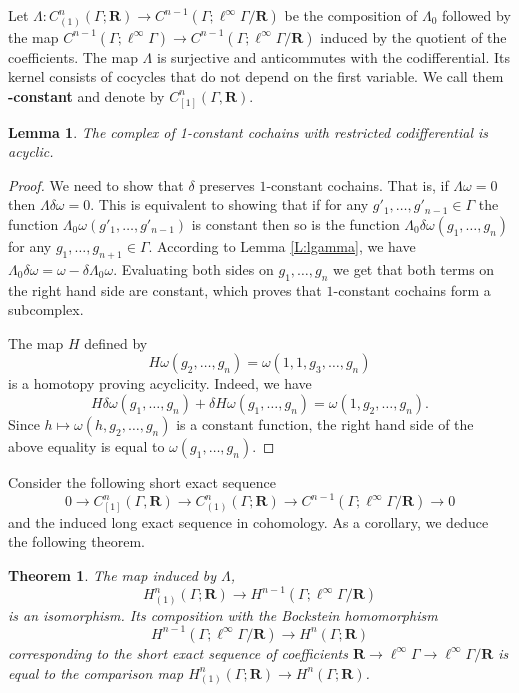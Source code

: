 \documentclass[12pt,reqno,a4paper]{amsart}
\renewcommand{\emph}[1]{{\bfseries\boldmath #1}}
\newtheorem{theorem}[subsection]{Theorem}%
\newtheorem{lemma}[subsection]{Lemma}
\theoremstyle{definition}
\theoremstyle{remark}
\numberwithin{equation}{section}
\numberwithin{figure}{section}
\newcommand{\B}[1]{{\mathbf #1}}
\begin{document}
Let $\Lambda\colon C^n_{(1)}(\Gamma;\B R)\to C^{n-1}(\Gamma;\ell^\infty\Gamma/\B R)$
be the composition of $\Lambda_0$ followed by the map
$C^{n-1}(\Gamma;\ell^{\infty}\Gamma) \to C^{n-1}(\Gamma;\ell^{\infty}\Gamma/\B R)$
induced by the quotient of the coefficients.
The map $\Lambda$ is surjective and anticommutes with the codifferential.  
Its kernel consists of cocycles that do not depend on the first variable.
We call them \emph{1-constant} and denote by $C^n_{[1]}(\Gamma,\B R)$.

\begin{lemma}\label{L:1-const}
The complex of 1-constant cochains with restricted codifferential is acyclic.
\end{lemma}

\begin{proof}
We need to show that $\delta$ preserves $1$-constant cochains. That is,
if $\Lambda\omega=0$ then $\Lambda\delta\omega=0$. This is equivalent to
showing that if for any $g'_1,\ldots,g'_{n-1}\in \Gamma$ the function
$\Lambda_0\omega(g'_1,\ldots,g'_{n-1})$ is constant then so is the function
$\Lambda_0\delta\omega(g_1,\ldots,g_{n})$ for any 
$g_1,\ldots,g_{n+1}\in \Gamma$. According to Lemma \ref{L:lgamma}, we have
$\Lambda_0\delta\omega = \omega - \delta\Lambda_0\omega$. 
Evaluating both sides on $g_1,\ldots,g_n$ we get that both
terms on the right hand side are constant, which proves that $1$-constant
cochains form a subcomplex.

The map $H$ defined by
$$
H\omega(g_2,\dots,g_n)=\omega(1,1,g_3,\dots,g_n)
$$
is a homotopy proving acyclicity. Indeed, we have
$$
H\delta\omega(g_1,\ldots,g_n) + \delta H\omega(g_1,\ldots,g_n)
=\omega(1,g_2,\ldots,g_n).
$$
Since $h\mapsto \omega(h,g_2,\ldots,g_n)$ is a constant function,
the right hand side of the above equality is equal to $\omega(g_1,\ldots,g_n)$.
\end{proof}

Consider the following short exact sequence
$$
0\to C^n_{[1]}(\Gamma,\B R)\to C^n_{(1)}(\Gamma;\B R)\to C^{n-1}(\Gamma;\ell^\infty\Gamma/\B R)\to0
$$
and the induced long exact sequence in cohomology.  As a corollary, we
deduce the following theorem.

\begin{theorem}\label{T:iso-bockstein}
The map induced by $\Lambda$,
$$
H^n_{(1)}(\Gamma;\B R)\to H^{n-1}(\Gamma;\ell^\infty\Gamma/\B R)
$$
is an isomorphism.
Its composition with the Bockstein homomorphism
$$
H^{n-1}(\Gamma;\ell^\infty\Gamma/\B R)\to H^n(\Gamma;\B R)
$$
corresponding to the short exact sequence of coefficients
$\B R\to \ell^\infty\Gamma\to\ell^\infty\Gamma/\B R$
is equal to the comparison map $H^n_{(1)}(\Gamma;\B R)\to H^n(\Gamma;\B R)$.
\end{theorem}
\end{document}
